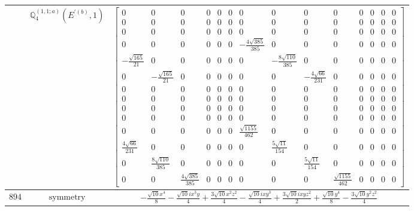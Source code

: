 \documentclass[fleqn,8pt,landscape]{jsarticle}
\begin{document}
\begin{longtable}{ccc}
$  $ & $ \mathbb{Q}_{4}^{(1,1;a)}(E^{\prime(b)},1) $ & $ \begin{bmatrix} 0 & 0 & 0 & 0 & 0 & 0 & 0 & 0 & 0 & 0 & 0 & 0 & 0 & 0 \\ 0 & 0 & 0 & 0 & 0 & 0 & 0 & 0 & 0 & 0 & 0 & 0 & 0 & 0 \\ 0 & 0 & 0 & 0 & 0 & 0 & 0 & 0 & 0 & 0 & 0 & 0 & 0 & 0 \\ 0 & 0 & 0 & 0 & 0 & 0 & - \frac{4 \sqrt{385}}{385} & 0 & 0 & 0 & 0 & 0 & 0 & 0 \\ - \frac{\sqrt{165}}{21} & 0 & 0 & 0 & 0 & 0 & 0 & - \frac{8 \sqrt{110}}{385} & 0 & 0 & 0 & 0 & 0 & 0 \\ 0 & - \frac{\sqrt{165}}{21} & 0 & 0 & 0 & 0 & 0 & 0 & - \frac{4 \sqrt{66}}{231} & 0 & 0 & 0 & 0 & 0 \\ 0 & 0 & 0 & 0 & 0 & 0 & 0 & 0 & 0 & 0 & 0 & 0 & 0 & 0 \\ 0 & 0 & 0 & 0 & 0 & 0 & 0 & 0 & 0 & 0 & 0 & 0 & 0 & 0 \\ 0 & 0 & 0 & 0 & 0 & 0 & 0 & 0 & 0 & 0 & 0 & 0 & 0 & 0 \\ 0 & 0 & 0 & 0 & 0 & 0 & 0 & 0 & 0 & 0 & 0 & 0 & 0 & 0 \\ 0 & 0 & 0 & 0 & 0 & 0 & \frac{\sqrt{1155}}{462} & 0 & 0 & 0 & 0 & 0 & 0 & 0 \\ \frac{4 \sqrt{66}}{231} & 0 & 0 & 0 & 0 & 0 & 0 & \frac{5 \sqrt{11}}{154} & 0 & 0 & 0 & 0 & 0 & 0 \\ 0 & \frac{8 \sqrt{110}}{385} & 0 & 0 & 0 & 0 & 0 & 0 & \frac{5 \sqrt{11}}{154} & 0 & 0 & 0 & 0 & 0 \\ 0 & 0 & \frac{4 \sqrt{385}}{385} & 0 & 0 & 0 & 0 & 0 & 0 & \frac{\sqrt{1155}}{462} & 0 & 0 & 0 & 0 \end{bmatrix} $ \\ \hline
$ 894 $ & $ \text{symmetry} $ & $ - \frac{\sqrt{10} x^{4}}{8} - \frac{\sqrt{10} i x^{3} y}{4} + \frac{3 \sqrt{10} x^{2} z^{2}}{4} - \frac{\sqrt{10} i x y^{3}}{4} + \frac{3 \sqrt{10} i x y z^{2}}{2} + \frac{\sqrt{10} y^{4}}{8} - \frac{3 \sqrt{10} y^{2} z^{2}}{4} $ \\

\end{longtable}
\end{document}
